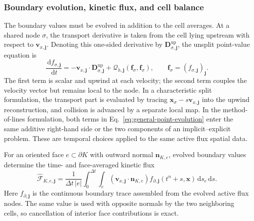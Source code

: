 \documentclass[preprint,3p,12pt]{elsarticle}
\newcommand{\dd}{\,\mathrm{d}}
\newcommand{\vct}[1]{\boldsymbol{#1}}
\begin{document}
\subsubsection{Boundary evolution, kinetic flux, and cell balance}

The boundary values must be evolved in addition to the cell averages. At a shared node $\sigma$, the transport derivative is taken from the cell lying upstream with respect to $\vct{v}_{x,\vct{j}}$. Denoting this one-sided derivative by $\vct{D}^{\mathrm{up}}_{\sigma,\vct{j}}$, the unsplit point-value equation is
\begin{equation}
  \frac{\dd f_{\sigma,\vct{j}}}{\dd t}
  =-\vct{v}_{x,\vct{j}}\cdot
    \vct{D}^{\mathrm{up}}_{\sigma,\vct{j}}
  +\mathcal{Q}_{h,\vct{j}}
   (\vct{f}_{\sigma},\vct{f}_{\sigma}),
  \qquad
  \vct{f}_{\sigma}=(f_{\sigma,\vct{j}})_{\vct{j}}.
  \label{eq:general-point-evolution}
\end{equation}
The first term is scalar and upwind at each velocity; the second term couples the velocity vector but remains local to the node. In a characteristic split formulation, the transport part is evaluated by tracing $\vct{x}_{\sigma}-s\vct{v}_{x,\vct{j}}$ into the upwind reconstruction, and collision is advanced by a separate local map. In the method-of-lines formulation, both terms in Eq.~\eqref{eq:general-point-evolution} enter the same additive right-hand side or the two components of an implicit--explicit problem. These are temporal choices applied to the same active flux spatial data.

For an oriented face $e\subset\partial K$ with outward normal $\vct{n}_{K,e}$, evolved boundary values determine the time- and face-averaged kinetic flux
\begin{equation}
  \widehat{\mathcal{F}}_{K,e,\vct{j}}
  =\frac{1}{\Delta t\,|e|}
   \int_0^{\Delta t}\int_e
   \left(\vct{v}_{x,\vct{j}}\cdot\vct{n}_{K,e}\right)
   f_{\partial,\vct{j}}(t^n+s,\vct{x})
   \dd s_e\dd s.
  \label{eq:general-space-time-flux}
\end{equation}
Here $f_{\partial,\vct{j}}$ is the continuous boundary trace assembled from the evolved active flux nodes. The same value is used with opposite normals by the two neighboring cells, so cancellation of interior face contributions is exact.
\end{document}

